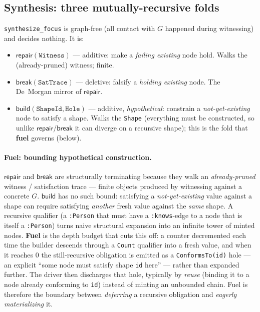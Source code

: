 \documentclass[11pt]{article}
\newcommand{\Repair}{\mathsf{repair}}
\newcommand{\Break}{\mathsf{break}}
\newcommand{\Build}{\mathsf{build}}
\newcommand{\code}[1]{\texttt{#1}}
\theoremstyle{definition}
\begin{document}
\subsection{Synthesis: three mutually-recursive folds}
\code{synthesize\_focus} is graph-free (all contact with $G$ happened during
witnessing) and decides nothing. It is:
\begin{itemize}[leftmargin=1.4em]
  \item $\Repair(\code{Witness})$ --- additive: make a \emph{failing existing}
  node hold. Walks the (already-pruned) witness; finite.
  \item $\Break(\code{SatTrace})$ --- deletive: falsify a \emph{holding existing}
  node. The De~Morgan mirror of $\Repair$.
  \item $\Build(\code{ShapeId},\code{Hole})$ --- additive, \emph{hypothetical}:
  constrain a \emph{not-yet-existing} node to satisfy a shape. Walks the
  \code{Shape} (everything must be constructed, so unlike $\Repair$/$\Break$ it can
  diverge on a recursive shape); this is the fold that \textbf{fuel} governs (below).
\end{itemize}

\paragraph{Fuel: bounding hypothetical construction.} $\Repair$ and $\Break$ are
structurally terminating because they walk an \emph{already-pruned} witness /
satisfaction trace --- finite objects produced by witnessing against a concrete
$G$. $\Build$ has no such bound: satisfying a \emph{not-yet-existing} value against
a shape can require satisfying \emph{another} fresh value against the \emph{same}
shape. A recursive qualifier (a \code{:Person} that must have a \code{:knows}-edge
to a node that is itself a \code{:Person}) turns naive structural expansion into an
infinite tower of minted nodes. \textbf{Fuel} is the depth budget that cuts this
off: a counter decremented each time the builder descends through a \code{Count}
qualifier into a fresh value, and when it reaches $0$ the still-recursive
obligation is emitted as a \code{ConformsTo(id)} hole --- an explicit ``some node
must satisfy shape \code{id} here'' --- rather than expanded further. The driver
then discharges that hole, typically by \emph{reuse} (binding it to a node already
conforming to \code{id}) instead of minting an unbounded chain. Fuel is therefore
the boundary between \emph{deferring} a recursive obligation and \emph{eagerly
materializing} it.
\end{document}
